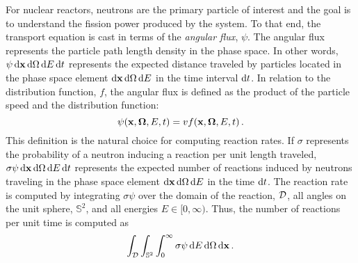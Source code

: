 \documentclass[../doc.tex]{subfiles}
\begin{document}
For nuclear reactors, neutrons are the primary particle of interest and the goal is to understand the fission power produced by the system. To that end, the transport equation is cast in terms of the \emph{angular flux}, $\psi$. The angular flux represents the particle path length density in the phase space. In other words, $\psi \mathop{}\!\mathrm{d} \boldsymbol{\mathrm{x}} \mathop{}\!\mathrm{d} \Omega \mathop{}\!\mathrm{d} E \mathop{}\!\mathrm{d} t$ represents the expected distance traveled by particles located in the phase space element $\mathop{}\!\mathrm{d} \boldsymbol{\mathrm{x}} \mathop{}\!\mathrm{d} \Omega\mathop{}\!\mathrm{d} E$ in the time interval $\mathop{}\!\mathrm{d} t$. In relation to the distribution function, $f$, the angular flux is defined as the product of the particle speed and the distribution function: 
	\begin{equation}
		\psi(\boldsymbol{\mathrm{x}},\boldsymbol{\Omega},E,t) = v f(\boldsymbol{\mathrm{x}},\boldsymbol{\Omega},E,t) \,. 
	\end{equation}
This definition is the natural choice for computing reaction rates. If $\sigma$ represents the probability of a neutron inducing a reaction per unit length traveled, $\sigma \psi \mathop{}\!\mathrm{d} \boldsymbol{\mathrm{x}} \mathop{}\!\mathrm{d} \Omega\mathop{}\!\mathrm{d} E \mathop{}\!\mathrm{d} t$ represents the expected number of reactions induced by neutrons traveling in the phase space element $\mathop{}\!\mathrm{d}\boldsymbol{\mathrm{x}}\mathop{}\!\mathrm{d}\Omega\mathop{}\!\mathrm{d} E$ in the time $\mathop{}\!\mathrm{d} t$. The reaction rate is computed by integrating $\sigma \psi$ over the domain of the reaction, $\mathcal{D}$, all angles on the unit sphere, $\mathbb{S}^2$, and all energies $E \in [0,\infty)$. Thus, the number of reactions per unit time is computed as 
	\begin{equation}
		\int_{\mathcal{D}} \int_{\mathbb{S}^2} \int_0^\infty \sigma \psi \mathop{}\!\mathrm{d} E \mathop{}\!\mathrm{d} \Omega \mathop{}\!\mathrm{d} \boldsymbol{\mathrm{x}} \,. 
	\end{equation}
\end{document}
